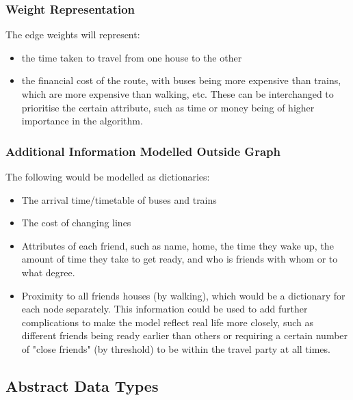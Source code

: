 \documentclass[
]{article}
\providecommand{\tightlist}{%
  \setlength{\itemsep}{0pt}\setlength{\parskip}{0pt}}
\begin{document}
\hypertarget{weight-representation}{%
\subsubsection{Weight Representation}\label{weight-representation}}

The edge weights will represent:

\begin{itemize}
\tightlist
\item
  the time taken to travel from one house to the other
\item
  the financial cost of the route, with buses being more expensive than
  trains, which are more expensive than walking, etc. These can be
  interchanged to prioritise the certain attribute, such as time or
  money being of higher importance in the algorithm.
\end{itemize}

\hypertarget{additional-information-modelled-outside-graph}{%
\subsubsection{Additional Information Modelled Outside
Graph}\label{additional-information-modelled-outside-graph}}

The following would be modelled as dictionaries:

\begin{itemize}
\tightlist
\item
  The arrival time/timetable of buses and trains
\item
  The cost of changing lines
\item
  Attributes of each friend, such as name, home, the time they wake up,
  the amount of time they take to get ready, and who is friends with
  whom or to what degree.
\item
  Proximity to all friends\textquotesingle{} houses (by walking), which
  would be a dictionary for each node separately. This information could
  be used to add further complications to make the model reflect real
  life more closely, such as different friends being ready earlier than
  others or requiring a certain number of "close friends" (by threshold)
  to be within the travel party at all times.
\end{itemize}

\hypertarget{abstract-data-types}{%
\subsection{Abstract Data Types}\label{abstract-data-types}}
\end{document}
